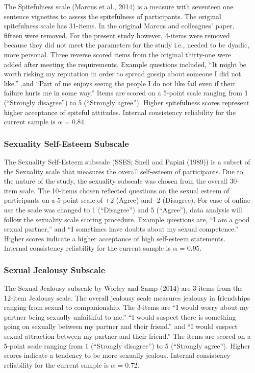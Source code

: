 \documentclass[
  english,
  a4paper]{apa7}
\begin{document}
The Spitefulness scale (Marcus et al., 2014) is a measure with seventeen one sentence vignettes to assess the spitefulness of participants. The original spitefulness scale has 31-items. In the original Marcus and colleagues' paper, fifteen were removed. For the present study however, 4-items were removed because they did not meet the parameters for the study i.e., needed to be dyadic, more personal. Three reverse scored items from the original thirty-one were added after meeting the requirements. Example questions included, ``It might be worth risking my reputation in order to spread gossip about someone I did not like.'' ,and ``Part of me enjoys seeing the people I do not like fail even if their failure hurts me in some way.'' Items are scored on a 5-point scale ranging from 1 (``Strongly disagree'') to 5 (``Strongly agree''). Higher spitefulness scores represent higher acceptance of spiteful attitudes. Internal consistency reliability for the current sample is \(\alpha\) = 0.84.

\hypertarget{sexuality-self-esteem-subscale}{%
\subsubsection{Sexuality Self-Esteem Subscale}\label{sexuality-self-esteem-subscale}}

The Sexuality Self-Esteem subscale (SSES; Snell and Papini (1989)) is a subset of the Sexuality scale that measures the overall self-esteem of participants. Due to the nature of the study, the sexuality subscale was chosen from the overall 30-item scale. The 10-items chosen reflected questions on the sexual esteem of participants on a 5-point scale of +2 (Agree) and -2 (Disagree). For ease of online use the scale was changed to 1 (``Disagree'') and 5 (``Agree''), data analysis will follow the sexuality scale scoring procedure. Example questions are, ``I am a good sexual partner,'' and ``I sometimes have doubts about my sexual competence.'' Higher scores indicate a higher acceptance of high self-esteem statements. Internal consistency reliability for the current sample is \(\alpha\) = 0.95.

\hypertarget{sexual-jealousy-subscale}{%
\subsubsection{Sexual Jealousy Subscale}\label{sexual-jealousy-subscale}}

The Sexual Jealousy subscale by Worley and Samp (2014) are 3-items from the 12-item Jealousy scale. The overall jealousy scale measures jealousy in friendships ranging from sexual to companionship. The 3-items are ``I would worry about my partner being sexually unfaithful to me.'' ``I would suspect there is something going on sexually between my partner and their friend.'' and ``I would suspect sexual attraction between my partner and their friend.'' The items are scored on a 5-point scale ranging from 1 (``Strongly disagree'') to 5 (``Strongly agree''). Higher scores indicate a tendency to be more sexually jealous. Internal consistency reliability for the current sample is \(\alpha\) = 0.72.
\end{document}
